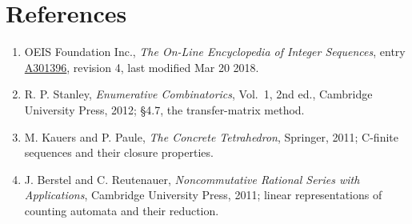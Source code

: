 \documentclass[11pt]{article}
\theoremstyle{definition}
\begin{document}
\section{References}

\begin{enumerate}

\item OEIS Foundation Inc., \emph{The On-Line Encyclopedia of Integer Sequences}, entry \href{https://oeis.org/A301396}{A301396}, revision 4, last modified Mar 20 2018.

\item R. P. Stanley, \emph{Enumerative Combinatorics}, Vol.~1, 2nd ed., Cambridge University Press, 2012; \S4.7, the transfer-matrix method.

\item M. Kauers and P. Paule, \emph{The Concrete Tetrahedron}, Springer, 2011; C-finite sequences and their closure properties.

\item J. Berstel and C. Reutenauer, \emph{Noncommutative Rational Series with Applications}, Cambridge University Press, 2011; linear representations of counting automata and their reduction.

\end{enumerate}
\end{document}

